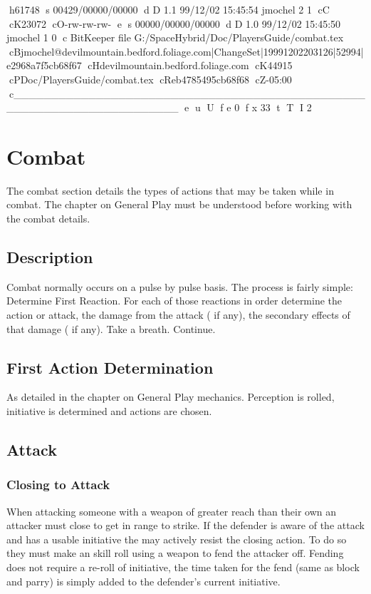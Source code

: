 h61748
s 00429/00000/00000
d D 1.1 99/12/02 15:45:54 jmochel 2 1
cC
cK23072
cO-rw-rw-rw-
e
s 00000/00000/00000
d D 1.0 99/12/02 15:45:50 jmochel 1 0
c BitKeeper file G:/SpaceHybrid/Doc/PlayersGuide/combat.tex
cBjmochel@devilmountain.bedford.foliage.com|ChangeSet|19991202203126|52994|e2968a7f5cb68f67
cHdevilmountain.bedford.foliage.com
cK44915
cPDoc/PlayersGuide/combat.tex
cReb4785495cb68f68
cZ-05:00
c______________________________________________________________________
e
u
U
f e 0
f x 33
t
T
I 2
\chapter{Combat}

The combat section details the types of actions that may be taken
while in combat. The chapter on General Play must be understood before working with the combat details.

\section{Description}

Combat normally occurs on a pulse by pulse basis. The process is
fairly simple: Determine First Reaction. For each of those reactions in
order determine the action or attack, the damage from the attack ( if
any), the secondary effects of that damage ( if any). Take a breath.
Continue.

\section{First Action Determination}

As detailed in the chapter on General Play mechanics. Perception
is rolled, initiative is determined and actions are chosen.

\section{Attack}

\subsection{Closing to Attack}

When attacking someone with a weapon of greater reach than their own an
attacker must close to get in range to strike. If the defender is aware
of the attack and has a usable initiative the may actively resist the
closing action. To do so they must make an skill roll using a weapon to
fend the attacker off. Fending does not require a re-roll of initiative,
the time taken for the fend (same as block and parry) is simply added to
the defender's current initiative.

